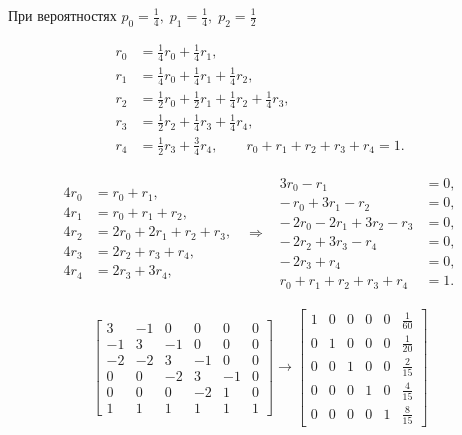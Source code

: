 При вероятностях $p_0=\tfrac{1}{4},\; p_1=\tfrac{1}{4},\; p_2=\tfrac{1}{2}$

\[
	\begin{aligned}
		r_0 & = \tfrac{1}{4}r_0 + \tfrac{1}{4}r_1,                                     \\
		r_1 & = \tfrac{1}{4}r_0 + \tfrac{1}{4}r_1 + \tfrac{1}{4}r_2,                   \\
		r_2 & = \tfrac{1}{2}r_0 + \tfrac{1}{2}r_1 + \tfrac{1}{4}r_2 + \tfrac{1}{4}r_3, \\
		r_3 & = \tfrac{1}{2}r_2 + \tfrac{1}{4}r_3 + \tfrac{1}{4}r_4,                   \\
		r_4 & = \tfrac{1}{2}r_3 + \tfrac{3}{4}r_4,\qquad
		r_0+r_1+r_2+r_3+r_4=1.
	\end{aligned}
\]

\[
	\begin{array}{rcl}
		\begin{aligned}
			4r_0 & = r_0 + r_1,               \\
			4r_1 & = r_0 + r_1 + r_2,         \\
			4r_2 & = 2r_0 + 2r_1 + r_2 + r_3, \\
			4r_3 & = 2r_2 + r_3 + r_4,        \\
			4r_4 & = 2r_3 + 3r_4,
		\end{aligned}
		 & \Rightarrow &
		\begin{aligned}
			3r_0 - r_1                  & = 0, \\
			-\,r_0 + 3r_1 - r_2         & = 0, \\
			-\,2r_0 - 2r_1 + 3r_2 - r_3 & = 0, \\
			-\,2r_2 + 3r_3 - r_4        & = 0, \\
			-\,2r_3 + r_4               & = 0, \\
			r_0+r_1+r_2+r_3+r_4         & = 1.
		\end{aligned}
	\end{array}
\]

\[
	\left[
		\begin{array}{rrrrr|r}
			3  & -1 & 0  & 0  & 0  & 0 \\
			-1 & 3  & -1 & 0  & 0  & 0 \\
			-2 & -2 & 3  & -1 & 0  & 0 \\
			0  & 0  & -2 & 3  & -1 & 0 \\
			0  & 0  & 0  & -2 & 1  & 0 \\
			1  & 1  & 1  & 1  & 1  & 1
		\end{array}
		\right]
	\longrightarrow
	\left[
		\begin{array}{rrrrr|r}
			1 & 0 & 0 & 0 & 0 & \tfrac{1}{60} \\
			0 & 1 & 0 & 0 & 0 & \tfrac{1}{20} \\
			0 & 0 & 1 & 0 & 0 & \tfrac{2}{15} \\
			0 & 0 & 0 & 1 & 0 & \tfrac{4}{15} \\
			0 & 0 & 0 & 0 & 1 & \tfrac{8}{15}
		\end{array}
		\right]
\]

